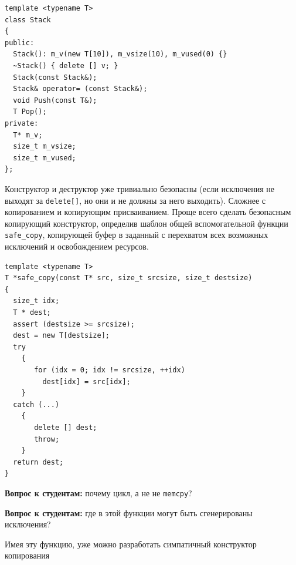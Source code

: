 \documentclass[a4paper,12pt,oneside]{article}
\newif\ifanswers
\begin{document}
\begin{lstlisting}
template <typename T> 
class Stack
{
public:
  Stack(): m_v(new T[10]), m_vsize(10), m_vused(0) {}
  ~Stack() { delete [] v; }
  Stack(const Stack&);
  Stack& operator= (const Stack&);
  void Push(const T&);
  T Pop();
private:
  T* m_v;
  size_t m_vsize;
  size_t m_vused;
};
\end{lstlisting}

Конструктор и деструктор уже тривиально безопасны (если исключения не выходят за \lstinline!delete[]!, но они и не должны за него выходить). Сложнее с копированием и копирующим присваиванием. Проще всего сделать безопасным копирующий конструктор, определив шаблон общей вспомогательной функции \lstinline!safe_copy!, копирующей буфер в заданный с перехватом всех возможных исключений и освобождением ресурсов.

\begin{lstlisting}
template <typename T>
T *safe_copy(const T* src, size_t srcsize, size_t destsize)
{
  size_t idx;
  T * dest;
  assert (destsize >= srcsize);
  dest = new T[destsize];
  try 
    {
       for (idx = 0; idx != srcsize, ++idx)
         dest[idx] = src[idx];
    }
  catch (...)
    {
       delete [] dest;
       throw;
    }
  return dest;
}
\end{lstlisting}

\textbf{Вопрос к студентам:} почему цикл, а не не \lstinline!memcpy!?

\ifanswers
Правильный ответ: потому что должны быть вызваны операторы присваивания для \lstinline!T!.
\fi

\textbf{Вопрос к студентам:} где в этой функции могут быть сгенерированы исключения?

\ifanswers
Внутри этой функции исключения могут быть сгенерированы:

\begin{itemize}
\item
В функции \lstinline!new!, переопределённым для \lstinline!T! оператором \lstinline!operator new! или конструктором  \lstinline!T! -- в этом случае никакой памяти выделено не будет и утечки не произойдёт, а исключения покинут  \lstinline!safe_copy!
\item
В функции  \lstinline!operator=! или  \lstinline!operator[]! типа  \lstinline!T! при копировании. В этом случае исключения будут перехвачены, ресурсы освобождены и исключения отпущены дальше.
\end{itemize}
\fi

Имея эту функцию, уже можно разработать симпатичный конструктор копирования
\end{document}
